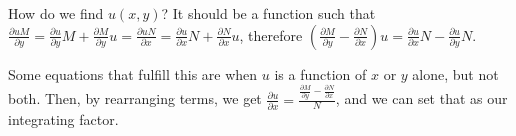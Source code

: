 \documentclass{article}
\begin{document}
How do we find $u(x,y)$? It should be a function such that $\frac{\partial uM}{\partial y} = \frac{\partial u}{\partial y}M + \frac{\partial M}{\partial y}u = \frac{\partial uN}{\partial x} = \frac{\partial u}{\partial x}N + \frac{\partial N}{\partial x}u$, therefore $(\frac{\partial M}{\partial y} - \frac{\partial N}{\partial x})u = \frac{\partial u}{\partial x}N - \frac{\partial u}{\partial y}N$.

Some equations that fulfill this are when $u$ is a function of $x$ or $y$ alone, but not both. Then, by rearranging terms, we get $\frac{\partial u}{\partial x} = \frac{\frac{\partial M}{\partial y} - \frac{\partial N}{\partial x}}{N}$, and we can set that as our integrating factor. 
\end{document}

